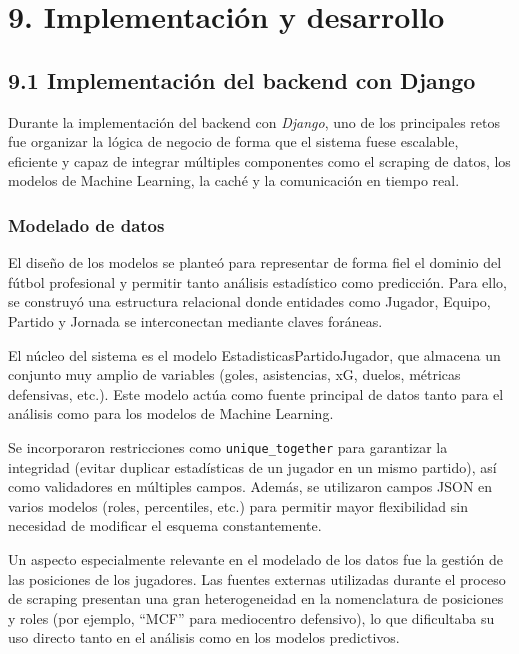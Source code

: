 
\section*{9. Implementación y desarrollo}
 
\subsection{9.1 Implementación del backend con Django}
 
Durante la implementación del backend con \textit{Django}, uno de los principales retos fue
organizar la lógica de negocio de forma que el sistema fuese escalable, eficiente y
capaz de integrar múltiples componentes como el scraping de datos, los modelos de
Machine Learning, la caché y la comunicación en tiempo real.
 
\subsubsection{Modelado de datos}
 
El diseño de los modelos se planteó para representar de forma fiel el dominio del
fútbol profesional y permitir tanto análisis estadístico como predicción. Para ello,
se construyó una estructura relacional donde entidades como Jugador, Equipo, Partido
y Jornada se interconectan mediante claves foráneas.
 
El núcleo del sistema es el modelo EstadisticasPartidoJugador, que almacena un
conjunto muy amplio de variables (goles, asistencias, xG, duelos, métricas defensivas,
etc.). Este modelo actúa como fuente principal de datos tanto para el análisis como
para los modelos de Machine Learning.
 
Se incorporaron restricciones como \texttt{unique\_together} para garantizar la
integridad (evitar duplicar estadísticas de un jugador en un mismo partido),
así como validadores en múltiples campos. Además, se utilizaron campos JSON en varios modelos
(roles, percentiles, etc.) para permitir mayor flexibilidad sin necesidad de
modificar el esquema constantemente.
 
Un aspecto especialmente relevante en el modelado de los datos fue la gestión de las posiciones
de los jugadores. Las fuentes externas utilizadas durante el proceso de scraping presentan una
gran heterogeneidad en la nomenclatura de posiciones y roles (por ejemplo, ``MCF'' para mediocentro
defensivo), lo que dificultaba su uso directo tanto en el análisis como en los modelos predictivos.
 
